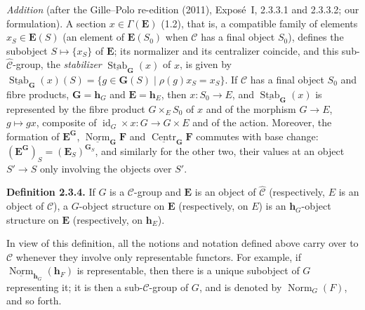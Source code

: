 \par\medskip\noindent{}%
\emph{Addition} (after the Gille--Polo re-edition (2011), Exposé~I, 2.3.3.1
and 2.3.3.2; our formulation). A section \(x\in\Gamma(\mathbf E)\) (1.2),
that is, a compatible family of elements \(x_S\in\mathbf E(S)\) (an element
of \(\mathbf E(S_0)\) when \(\mathscr C\) has a final object \(S_0\)),
defines the subobject \(S\mapsto\{x_S\}\) of \(\mathbf E\); its normalizer
and its centralizer coincide, and this sub-\(\widehat{\mathscr C}\)-group,
the \emph{stabilizer} \(\underline{\operatorname{Stab}}_{\mathbf G}(x)\) of
\(x\), is given by
\(\underline{\operatorname{Stab}}_{\mathbf G}(x)(S)=\{g\in\mathbf G(S)\mid\rho(g)x_S=x_S\}\).
If \(\mathscr C\) has a final object \(S_0\) and fibre products,
\(\mathbf G=\mathbf h_G\) and \(\mathbf E=\mathbf h_E\), then
\(x:S_0\to E\), and \(\underline{\operatorname{Stab}}_{\mathbf G}(x)\) is
represented by the fibre product \(G\times_ES_0\) of \(x\) and of the
morphism \(G\to E\), \(g\mapsto gx\), composite of
\(\operatorname{id}_G\times x:G\to G\times E\) and of the action. Moreover,
the formation of \(\mathbf E^{\mathbf G}\),
\(\underline{\operatorname{Norm}}_{\mathbf G}\mathbf F\) and
\(\underline{\operatorname{Centr}}_{\mathbf G}\mathbf F\) commutes with base
change: \((\mathbf E^{\mathbf G})_S=(\mathbf E_S)^{\mathbf G_S}\), and
similarly for the other two, their values at an object \(S'\to S\) only
involving the objects over \(S'\).
\par\medskip

\medskip
\noindent{}\textbf{Definition 2.3.4.}
If \(G\) is a \(\mathscr C\)-group and \(\mathbf E\) is an object of
\(\widehat{\mathscr C}\) (respectively, \(E\) is an object of
\(\mathscr C\)), a \(G\)-object structure on \(\mathbf E\)
(respectively, on \(E\)) is an \(\mathbf h_G\)-object structure on
\(\mathbf E\) (respectively, on \(\mathbf h_E\)).

In view of this definition, all the notions and notation defined above
carry over to \(\mathscr C\) whenever they involve only representable
functors. For example, if
\(\underline{\operatorname{Norm}}_{\mathbf h_G}(\mathbf h_F)\) is
representable, then there is a unique subobject of \(G\) representing
it; it is then a sub-\(\mathscr C\)-group of \(G\), and is denoted by
\(\operatorname{Norm}_G(F)\), and so forth.

